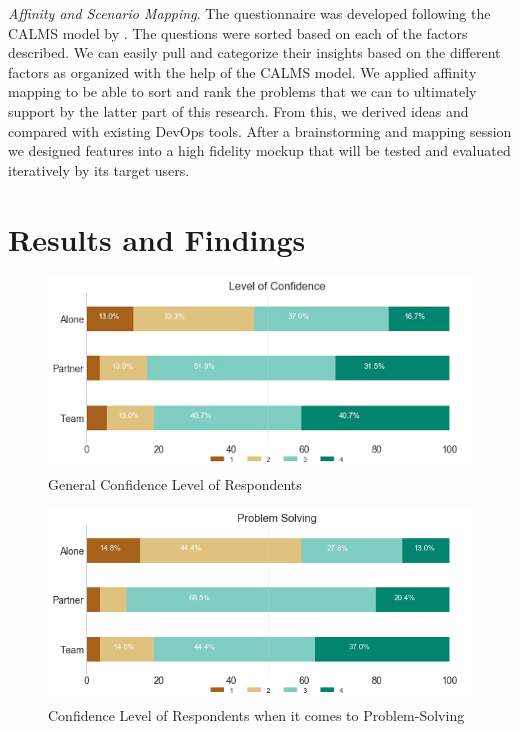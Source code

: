 \documentclass{sigchi}
\begin{document}
\textit{Affinity and Scenario Mapping}. The questionnaire was developed following the CALMS model by \cite{riley2014keep}. The questions were sorted based on each of the factors described. We can easily pull and categorize their insights based on the different factors as organized with the help of the CALMS model. We applied affinity mapping to be able to sort and rank the problems that we can to ultimately support by the latter part of this research. From this, we derived ideas and compared with existing DevOps tools. After a brainstorming and mapping session we designed features into a high fidelity mockup that will be tested and evaluated iteratively by its target users. 

\section{Results and Findings}

\begin{figure}
    \centering
    \includegraphics[scale=0.45]{figures/Figure_ConfidenceLevel.png}
    \caption{General Confidence Level of Respondents}
    \label{fig:genconf}
\end{figure}

\begin{figure}
    \centering
    \includegraphics[scale=0.4]{figures/Figure_ProblemSolving.png}
    \caption{Confidence Level of Respondents when it comes to Problem-Solving}
    \label{fig:probsol}
\end{figure}
\end{document}
